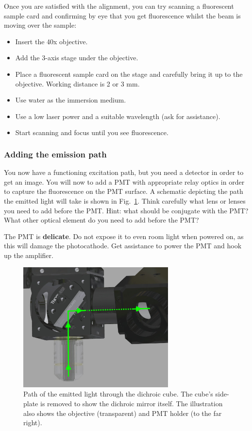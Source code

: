 \documentclass[a4paper]{report}
\begin{document}
Once you are satisfied with the alignment, you can try scanning a fluorescent sample card and confirming by eye that you get fluorescence whilst the beam is moving over the sample:
\begin{itemize}
    \setlength\itemsep{0.15em}
     \item Insert the 40x objective.
     \item Add the 3-axis stage under the objective.
     \item Place a fluorescent sample card on the stage and carefully bring it up to the objective. Working distance is 2 or 3 mm. 
     \item Use water as the immersion medium.
     \item Use a low laser power and a suitable wavelength (ask for assistance). 
     \item Start scanning and focus until you see fluorescence.
 \end{itemize}

\clearpage

\subsubsection{Adding the emission path}
You now have a functioning excitation path, but you need a detector in order to get an image. 
You will now to add a PMT with appropriate relay optics in order to capture the fluorescence on the PMT surface. 
A schematic depicting the path the emitted light will take is shown in Fig.~\ref{fig:dichroic_holder_paths}.
Think carefully what lens or lenses you need to add before the PMT. 
Hint: what should be conjugate with the PMT?
What other optical element do you need to add before the PMT?

The PMT is \textbf{delicate}. 
Do not expose it to even room light when powered on, as this will damage the photocathode. 
Get assistance to power the PMT and hook up the amplifier. 
\begin{figure}[h]
\center
\includegraphics[width=3.1in]{cube_emission_cutout.eps}
\caption{Path of the emitted light through the dichroic cube. The cube's side-plate is removed to show the dichroic mirror itself. The illustration also shows the objective (transparent) and PMT holder (to the far right).}
\label{fig:dichroic_holder_paths}
\end{figure}
\end{document}
